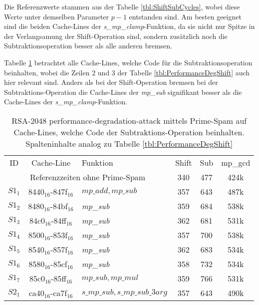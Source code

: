 Die Referenzwerte stammen aus der Tabelle \ref{tbl:ShiftSubCycles}, wobei diese Werte unter demselben Parameter $p-1$ entstanden sind.
Am besten geeignet sind die beiden Cache-Lines der \textit{s_mp_clamp}-Funktion, da sie nicht nur Spitze in der Verlangsamung der Shift-Operation sind, sondern zusätzlich noch die Subtraktionsoperation besser als alle anderen bremsen.

Tabelle \ref{tbl:PerformanceDegSub} betrachtet alle Cache-Lines, welche Code für die Subtraktionsoperation beinhalten, wobei die Zeilen 2 und 3 der Tabelle \ref{tbl:PerformanceDegShift} auch hier relevant sind.
Anders als bei der Shift-Operation bremsen bei der Subtraktions-Operation die Cache-Lines der \textit{mp_sub} signifikant besser als die Cache-Lines der \textit{s_mp_clamp}-Funktion.

\begin{table}[h]
\caption{RSA-2048 performance-degradation-attack mittels Prime-Spam auf Cache-Lines, welche Code der Subtraktions-Operation beinhalten.
Spalteninhalte analog zu Tabelle \ref{tbl:PerformanceDegShift}}
\label{tbl:PerformanceDegSub}
\begin{tabular}{cclccc}
ID &Cache-Line & Funktion                     & Shift & Sub & mp\_gcd \\[10pt]
\multicolumn{3}{c}{Referenzzeiten ohne Prime-Spam}        & 340   & 477         & 424k    \\
$S1_1$ & 8440$_{16}$-847f$_{16}$  & $mp\_add, mp\_sub$             & 357   & 643         & 487k    \\
$S1_2$ & 8480$_{16}$-84bf$_{16}$  & \textit{mp_sub}                      & 359   & 684         & 538k    \\
$S1_3$ & 84c0$_{16}$-84ff$_{16}$  & \textit{mp_sub}                      & 362   & 681         & 531k    \\
$S1_4$ & 8500$_{16}$-853f$_{16}$  & \textit{mp_sub}                      & 357   & 700         & 538k    \\
$S1_5$ & 8540$_{16}$-857f$_{16}$  & \textit{mp_sub}                      & 362   & 683         & 534k    \\
$S1_6$ & 8580$_{16}$-85cf$_{16}$  & \textit{mp_sub}                      & 358   & 732         & 534k    \\
$S1_7$ & 85c0$_{16}$-85ff$_{16}$  & $mp\_sub, mp\_mul$            & 359   & 766         & 531k    \\ \hline
$S2_1$ & ca40$_{16}$-ca7f$_{16}$  & $s\_mp\_sub, s\_mp\_sub\_3arg$ & 357   & 643         & 490k    \\

\end{tabular}
\end{table}
